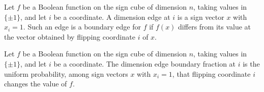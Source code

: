 \begin{definition}
\label{FABL.IsBoundaryDimensionEdge}
\leanok
{}
Let $f$ be a Boolean function on the sign cube of dimension $n$, taking values in
$\{\pm1\}$, and let $i$ be a coordinate. A dimension edge at $i$ is a sign vector $x$
with $x_i=1$. Such an edge is a boundary edge for $f$ if $f(x)$ differs from its value
at the vector obtained by flipping coordinate $i$ of $x$.
\end{definition}

\begin{definition}
\label{FABL.dimensionEdgeBoundaryFraction}
\leanok
{}
Let $f$ be a Boolean function on the sign cube of dimension $n$, taking values in
$\{\pm1\}$, and let $i$ be a coordinate. The dimension edge boundary fraction at $i$ is
the uniform probability, among sign vectors $x$ with $x_i=1$, that flipping coordinate
$i$ changes the value of $f$.
\end{definition}

